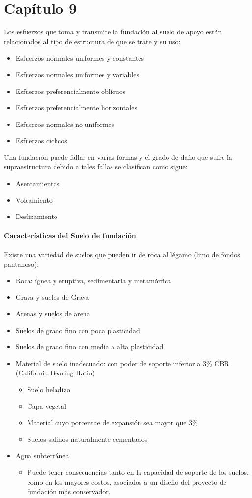 \part{Capítulo 9}
Los esfuerzos que toma y transmite la fundación al suelo de apoyo están relacionados al tipo de estructura de que se trate y su uso:
\begin{itemize}
    \item Esfuerzos normales uniformes y constantes
    \item Esfuerzos normales uniformes y variables
    \item Esfuerzos preferencialmente oblicuos
    \item Esfuerzos preferencialmente horizontales
    \item Esfuerzos normales no uniformes
    \item Esfuerzos cíclicos
\end{itemize}

Una fundación puede fallar en varias formas y el grado de daño que sufre la supraestructura debido a tales fallas se clasifican como sigue:
\begin{itemize}
    \item Asentamientos
    \item Volcamiento
    \item Deslizamiento
\end{itemize}

\subsection{Características del Suelo de fundación}
Existe una variedad de suelos que pueden ir de roca al légamo (limo de fondos pantanoso):
\begin{itemize}
    \item Roca: ígnea y eruptiva, sedimentaria y metamórfica
    \item Grava y suelos de Grava
    \item Arenas y suelos de arena
    \item Suelos de grano fino con poca plasticidad
    \item Suelos de grano fino con media a alta plasticidad
    \item Material de suelo inadecuado: con poder de soporte inferior a 3\% CBR (California Bearing Ratio)
    \begin{itemize}
        \item Suelo heladizo
        \item Capa vegetal
        \item Material cuyo porcentae de expansión sea mayor que 3\%
        \item Suelos salinos naturalmente cementados
    \end{itemize}
    \item Agua subterránea
    \begin{itemize}
        \item Puede tener consecuencias tanto en la capacidad de soporte de los suelos, como en los mayores costos, asociados a un diseño del proyecto de fundación más conservador.
    \end{itemize}
\end{itemize}

